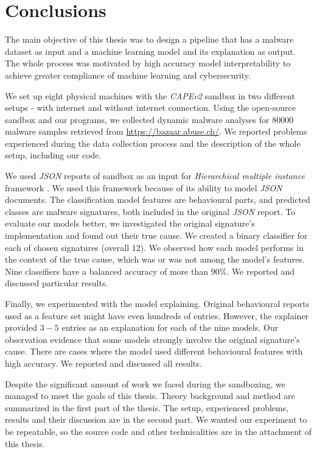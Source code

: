\chapter{Conclusions} \label{chap:concl}
The main objective of this thesis was to design a pipeline that has a malware dataset as input and a machine learning model and its explanation as output. The whole process was motivated by high accuracy model interpretability to achieve greater compliance of machine learning and cybersecurity.

We set up eight physical machines with the \emph{CAPEv2} sandbox in two different setups - with internet and without internet connection. Using the open-source sandbox and our programs, we collected dynamic malware analyses for $80 000$ malware samples retrieved from \url{https://bazaar.abuse.ch/}. We reported problems experienced during the data collection process and the description of the whole setup, including our code.

We used \emph{JSON} reports of sandbox as an input for \emph{Hierarchical multiple instance} framework \cite{Mandlik2020}. We used this framework because of its ability to model \emph{JSON} documents. The classification model features are behavioural parts, and predicted classes are malware signatures, both included in the original \emph{JSON} report. 
To evaluate our models better, we investigated the original signature's implementation and found out their true cause. We created a binary classifier for each of chosen signatures (overall 12). We observed how each model performs in the context of the true cause, which was or was not among the model's features. Nine classifiers have a balanced accuracy of more than $90\%$. We reported and discussed particular results.

Finally, we experimented with the model explaining. Original behavioural reports used as a feature set might have even hundreds of entries. However, the explainer provided $3-5$ entries as an explanation for each of the nine models. Our observation evidence that some models strongly involve the original signature's cause. There are cases where the model used different behavioural features with high accuracy. We reported and discussed all results.

Despite the significant amount of work we faced during the sandboxing, we managed to meet the goals of this thesis. Theory background and method are summarized in the first part of the thesis. The setup, experienced problems, results and their discussion are in the second part. We wanted our experiment to be repeatable, so the source code and other technicalities are in the attachment of this thesis.

